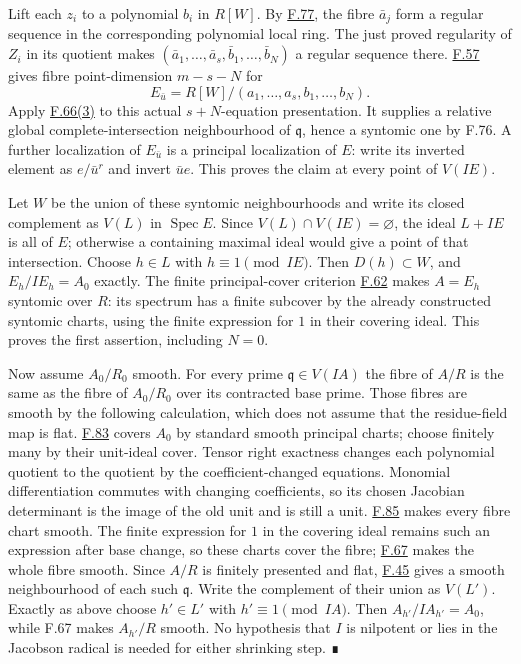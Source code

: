 \documentclass[11pt,a4paper,openany]{report}
\begin{document}
Lift each \(z_i\) to a polynomial \(b_i\) in \(R[W]\). By \hyperref[AG-RG-S05-algebra-lemma-relative-global-complete-intersection-conormal]{F.77}, the fibre \(\bar a_j\) form a regular sequence in the corresponding polynomial local ring. The just proved regularity of \(Z_i\) in its quotient makes \((\bar a_1,\ldots,\bar a_s,\bar b_1,\ldots,\bar b_N)\) a regular sequence there. \hyperref[AG-RG-S05-algebra-lemma-lci]{F.57} gives fibre point-dimension \(m-s-N\) for \[E_{\bar u}=R[W]/(a_1,\ldots,a_s,b_1,\ldots,b_N).\] Apply \hyperref[AG-RG-S05-algebra-lemma-localize-relative-complete-intersection]{F.66(3)} to this actual \(s+N\)-equation presentation. It supplies a relative global complete-intersection neighbourhood of \(\mathfrak q\), hence a syntomic one by F.76. A further localization of \(E_{\bar u}\) is a principal localization of \(E\): write its inverted element as \(e/\bar u^r\) and invert \(\bar u e\). This proves the claim at every point of \(V(IE)\).

Let \(W\) be the union of these syntomic neighbourhoods and write its closed complement as \(V(L)\) in \(\operatorname{Spec}E\). Since \(V(L)\cap V(IE)=\varnothing\), the ideal \(L+IE\) is all of \(E\); otherwise a containing maximal ideal would give a point of that intersection. Choose \(h\in L\) with \(h\equiv1\pmod{IE}\). Then \(D(h)\subset W\), and \(E_h/IE_h=A_0\) exactly. The finite principal-cover criterion \hyperref[AG-RG-S05-algebra-lemma-local-syntomic]{F.62} makes \(A=E_h\) syntomic over \(R\): its spectrum has a finite subcover by the already constructed syntomic charts, using the finite expression for \(1\) in their covering ideal. This proves the first assertion, including \(N=0\).

Now assume \(A_0/R_0\) smooth. For every prime \(\mathfrak q\in V(IA)\) the fibre of \(A/R\) is the same as the fibre of \(A_0/R_0\) over its contracted base prime. Those fibres are smooth by the following calculation, which does not assume that the residue-field map is flat. \hyperref[AG-RG-S05-algebra-lemma-smooth-syntomic]{F.83} covers \(A_0\) by standard smooth principal charts; choose finitely many by their unit-ideal cover. Tensor right exactness changes each polynomial quotient to the quotient by the coefficient-changed equations. Monomial differentiation commutes with changing coefficients, so its chosen Jacobian determinant is the image of the old unit and is still a unit. \hyperref[AG-RG-S05-algebra-lemma-standard-smooth]{F.85} makes every fibre chart smooth. The finite expression for \(1\) in the covering ideal remains such an expression after base change, so these charts cover the fibre; \hyperref[AG-RG-S05-algebra-lemma-locally-smooth]{F.67} makes the whole fibre smooth. Since \(A/R\) is finitely presented and flat, \hyperref[AG-RG-S05-algebra-lemma-flat-fibre-smooth]{F.45} gives a smooth neighbourhood of each such \(\mathfrak q\). Write the complement of their union as \(V(L')\). Exactly as above choose \(h'\in L'\) with \(h'\equiv1\pmod{IA}\). Then \(A_{h'}/IA_{h'}=A_0\), while F.67 makes \(A_{h'}/R\) smooth. No hypothesis that \(I\) is nilpotent or lies in the Jacobson radical is needed for either shrinking step. ∎
\end{document}
